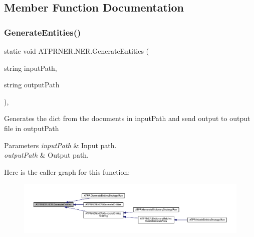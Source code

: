 \subsection{Member Function Documentation}
\hypertarget{class_a_t_p_r_n_e_r_1_1_n_e_r_ac52e8765543f6342e2fb0fd4283f10d7}{}\label{class_a_t_p_r_n_e_r_1_1_n_e_r_ac52e8765543f6342e2fb0fd4283f10d7} 
\subsubsection{\texorpdfstring{Generate\+Entities()}{GenerateEntities()}\hspace{0.1cm}{\footnotesize\ttfamily [1/2]}}
{\footnotesize\ttfamily static void A\+T\+P\+R\+N\+E\+R.\+N\+E\+R.\+Generate\+Entities (\begin{DoxyParamCaption}\item[{string}]{input\+Path,  }\item[{string}]{output\+Path }\end{DoxyParamCaption})\hspace{0.3cm}{\ttfamily [inline]}, {\ttfamily [static]}}



Generates the dict from the documents in input\+Path and send output to output file in output\+Path 


\begin{DoxyParams}{Parameters}
{\em input\+Path} & Input path.\\
\hline
{\em output\+Path} & Output path.\\
\hline
\end{DoxyParams}
Here is the caller graph for this function\+:
\nopagebreak
\begin{figure}[H]
\begin{center}
\leavevmode
\includegraphics[width=350pt]{d5/dec/class_a_t_p_r_n_e_r_1_1_n_e_r_ac52e8765543f6342e2fb0fd4283f10d7_icgraph}
\end{center}
\end{figure}
\hypertarget{class_a_t_p_r_n_e_r_1_1_n_e_r_afbf080a32a868531adb8c7f4ec5f8035}{}\label{class_a_t_p_r_n_e_r_1_1_n_e_r_afbf080a32a868531adb8c7f4ec5f8035} 
